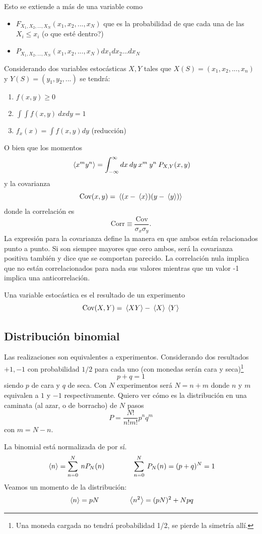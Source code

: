 \documentclass[10pt,oneside]{CBFT_book}
\begin{document}
Esto se extiende a más de una variable como
\begin{itemize}
 \item $F_{X_1,X_2,...,X_N}(x_1,x_2,...,x_N)$ que es la probabilidad de que
 cada una de las $X_i \leq x_i$ (o que esté dentro?)
 \item $P_{X_1,X_2,...,X_N}(x_1,x_2,...,x_N) dx_1 dx_2 ... dx_N$
\end{itemize}

Considerando dos variables estocásticas $X,Y$ tales que 
$X(S)=(x_1,x_2,...,x_n)$ y $Y(S)=(y_1,y_2,...)$
se tendrá:
\begin{enumerate}
 \item $ f(x,y) \geq 0 $
 \item $ \int \int f(x,y) \: dx dy = 1 $
 \item $ f_x(x) = \int f(x,y) dy $ (reducción)
\end{enumerate}

O bien que los momentos
\[
	\:\left\langle x^m y^n \right\rangle = \int_{-\infty}^\infty dx \: dy \: x^m \: y^n \: P_{X,Y}(x,y)
\]
y la covarianza
\[
	\text{Cov}(x,y) = \:\left\langle  (x - \:\left\langle x \right\rangle) (y - \:\left\langle y \right\rangle) \right\rangle
\]
donde la correlación es
\[
	\text{Corr} \equiv \frac{\text{Cov}}{\sigma_x \sigma_y }.
\]
La expresión para la covarianza define la manera en que ambos están relacionados
punto a punto. Si son siempre mayores que cero ambos, será la covarianza positiva
también y dice que se comportan parecido. La correlación nula implica que no están
correlacionados para nada sus valores mientras que un valor -1 implica una
anticorrelación.

Una variable estocástica es el resultado de un experimento
\[
	\text{Cov}(X,Y) = \:\left\langle XY \right\rangle - \:\left\langle X \right\rangle \:\left\langle Y \right\rangle
\]

\subsection{Distribución binomial}

Las realizaciones son equivalentes a experimentos.
Considerando dos resultados $+1,-1$ con probabilidad $1/2$ para cada uno (con monedas
serán cara y seca)\footnote{Una moneda cargada no tendrá probabilidad 1/2, se pierde
la simetría allí.}
\[
	p + q = 1
\]
siendo $p$ de cara y $q$ de seca. 
Con $N$ experimentos será $N=n+m$ donde $n$ y $m$ equivalen a $1$ y $-1$ respectivamente.
Quiero ver cómo es la distribución en una caminata (al azar, o de borracho) de
$N$ pasos
\[
	P = \frac{N!}{n! m!} p^n q^m
\]
con $m = N-n$.

La binomial está normalizada de por sí.
\[
	\:\left\langle n \right\rangle = \sum_{n=0}^N \: n P_N(n) \qquad \qquad 
	\sum_{n=0}^N \: P_N(n) = ( p + q )^N = 1
\]
Veamos un momento de la distribución:
\[
	\:\left\langle n \right\rangle = p N \qquad \qquad  \:\left\langle n^2 \right\rangle = (p N)^2 + N p q
\]
\end{document}
